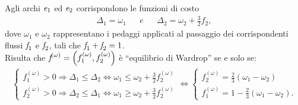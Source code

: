 \documentclass[11pt,largemargins]{homework}
\begin{document}
\begin{enumerate}
    

  \end{enumerate}

  \newpage
\section{}%
 
 \begin{alphaparts}
    \questionpart

    Agli archi $\emph{e}_{1}$ ed $\emph{e}_{2}$ corrispondono le funzioni di costo 
    \begin{align*}
    \Delta_{1}=\omega_{1} && e && \Delta_{2}=\omega_{2}+\frac{3}{2}f_{2},
    \end{align*}
   dove $\omega_{1}$ e $\omega_{2}$ rappresentano i pedaggi applicati al passaggio dei corrispondenti flussi $\emph{f}_{1}$ e $\emph{f}_{2}$, tali che $\emph{f}_{1}+\emph{f}_{2}=1$.\\
    Risulta che $\emph{f}^{(\omega)}=\left(f_{1}^{(\omega)},f_{2}^{(\omega)}\right)$  è  ``equilibrio  di  Wardrop'' se e solo se:
    \begin{align*}    
    \begin{cases}f_{1}^{(\omega)}>0  \Rightarrow  \Delta_{1}\leq\Delta_{2}  \Leftrightarrow  \omega_{1}  \leq  \omega_{2}+\frac{3}{2}f_{2}^{(\omega)}\\
    f_{2}^{(\omega)}>0  \Rightarrow  \Delta_{2}\leq\Delta_{1}  \Leftrightarrow  \omega_{1}  \geq  \omega_{2}+\frac{3}{2}f_{2}^{(\omega)}\end{cases}
    \Leftrightarrow \begin{cases}f_{2}^{(\omega)}=\frac{2}{3}\left(\omega_{1}-\omega_{2}\right)\\ f_{1}^{(\omega)}=1-\frac{2}{3}\left(\omega_{1}-\omega_{2}\right).\end{cases}
    \end{align*}
    

\end{alphaparts}
\end{document}
